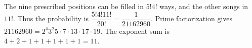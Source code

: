 The nine prescribed positions can be filled in $5!4!$ ways, and the other songs in $11!$. Thus the probability is $\dfrac{5!4!11!}{20!}=\dfrac{1}{21162960}$. Prime factorization gives $21162960=2^4 3^2 5\cdot7\cdot13\cdot17\cdot19$. The exponent sum is $4+2+1+1+1+1+1=\boxed{11}$.
